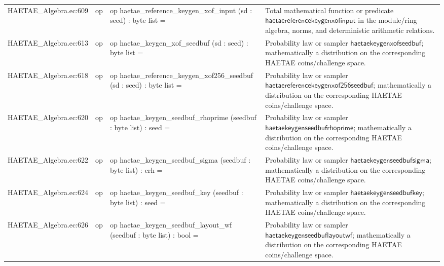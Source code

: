 \documentclass[10pt]{article}
\begin{document}
\begin{longtable}{L{0.11\textwidth}L{0.055\textwidth}L{0.385\textwidth}L{0.41\textwidth}}
HAETAE\_\allowbreak{}Algebra.\allowbreak{}ec:\allowbreak{}609 & op & {\ttfamily\scriptsize op haetae\_\allowbreak{}reference\_\allowbreak{}keygen\_\allowbreak{}xof\_\allowbreak{}input (sd : seed) : byte list =} & Total mathematical function or predicate $\mathsf{haetaereferencekeygenxofinput}$ in the module/ring algebra, norms, and deterministic arithmetic relations. \\
HAETAE\_\allowbreak{}Algebra.\allowbreak{}ec:\allowbreak{}613 & op & {\ttfamily\scriptsize op haetae\_\allowbreak{}keygen\_\allowbreak{}xof\_\allowbreak{}seedbuf (sd : seed) : byte list =} & Probability law or sampler $\mathsf{haetaekeygenxofseedbuf}$; mathematically a distribution on the corresponding HAETAE coins/challenge space. \\
HAETAE\_\allowbreak{}Algebra.\allowbreak{}ec:\allowbreak{}618 & op & {\ttfamily\scriptsize op haetae\_\allowbreak{}reference\_\allowbreak{}keygen\_\allowbreak{}xof256\_\allowbreak{}seedbuf (sd : seed) : byte list =} & Probability law or sampler $\mathsf{haetaereferencekeygenxof256seedbuf}$; mathematically a distribution on the corresponding HAETAE coins/challenge space. \\
HAETAE\_\allowbreak{}Algebra.\allowbreak{}ec:\allowbreak{}620 & op & {\ttfamily\scriptsize op haetae\_\allowbreak{}keygen\_\allowbreak{}seedbuf\_\allowbreak{}rhoprime (seedbuf : byte list) : seed =} & Probability law or sampler $\mathsf{haetaekeygenseedbufrhoprime}$; mathematically a distribution on the corresponding HAETAE coins/challenge space. \\
HAETAE\_\allowbreak{}Algebra.\allowbreak{}ec:\allowbreak{}622 & op & {\ttfamily\scriptsize op haetae\_\allowbreak{}keygen\_\allowbreak{}seedbuf\_\allowbreak{}sigma (seedbuf : byte list) : crh =} & Probability law or sampler $\mathsf{haetaekeygenseedbufsigma}$; mathematically a distribution on the corresponding HAETAE coins/challenge space. \\
HAETAE\_\allowbreak{}Algebra.\allowbreak{}ec:\allowbreak{}624 & op & {\ttfamily\scriptsize op haetae\_\allowbreak{}keygen\_\allowbreak{}seedbuf\_\allowbreak{}key (seedbuf : byte list) : seed =} & Probability law or sampler $\mathsf{haetaekeygenseedbufkey}$; mathematically a distribution on the corresponding HAETAE coins/challenge space. \\
HAETAE\_\allowbreak{}Algebra.\allowbreak{}ec:\allowbreak{}626 & op & {\ttfamily\scriptsize op haetae\_\allowbreak{}keygen\_\allowbreak{}seedbuf\_\allowbreak{}layout\_\allowbreak{}wf (seedbuf : byte list) : bool =} & Probability law or sampler $\mathsf{haetaekeygenseedbuflayoutwf}$; mathematically a distribution on the corresponding HAETAE coins/challenge space. \\

\end{longtable}
\end{document}
